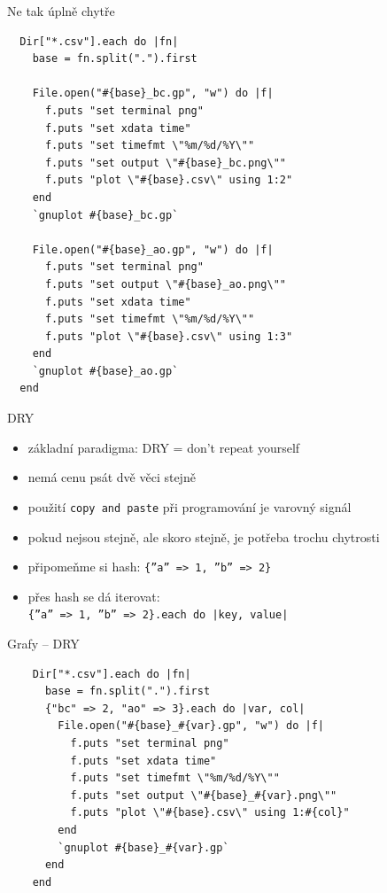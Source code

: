 \documentclass{beamer}
\begin{document}
\begin{frame}[fragile]{Ne tak úplně chytře}
  \tiny
\begin{verbatim}
  Dir["*.csv"].each do |fn|
    base = fn.split(".").first

    File.open("#{base}_bc.gp", "w") do |f|
      f.puts "set terminal png"
      f.puts "set xdata time"
      f.puts "set timefmt \"%m/%d/%Y\""
      f.puts "set output \"#{base}_bc.png\""
      f.puts "plot \"#{base}.csv\" using 1:2"
    end
    `gnuplot #{base}_bc.gp`

    File.open("#{base}_ao.gp", "w") do |f|
      f.puts "set terminal png"
      f.puts "set output \"#{base}_ao.png\""
      f.puts "set xdata time"
      f.puts "set timefmt \"%m/%d/%Y\""
      f.puts "plot \"#{base}.csv\" using 1:3"
    end
    `gnuplot #{base}_ao.gp`
  end
\end{verbatim}
\end{frame}

\begin{frame}[fragile]{DRY}
  \begin{itemize}
    \item základní paradigma: DRY = don't repeat yourself
    \item nemá cenu psát dvě věci stejně
    \item použití \texttt{copy and paste} při programování je varovný signál
    \item pokud nejsou stejně, ale skoro stejně, je potřeba trochu chytrosti
    \item připomeňme si hash: \texttt{\{''a'' => 1, ''b'' => 2\}}
    \item přes hash se dá iterovat: \\ \texttt{\{''a'' => 1, ''b'' => 2\}.each do |key, value|}
  \end{itemize}
\end{frame}

\begin{frame}[fragile]{Grafy -- DRY}
  \tiny
  \begin{verbatim}
    Dir["*.csv"].each do |fn|
      base = fn.split(".").first
      {"bc" => 2, "ao" => 3}.each do |var, col|
        File.open("#{base}_#{var}.gp", "w") do |f|
          f.puts "set terminal png"
          f.puts "set xdata time"
          f.puts "set timefmt \"%m/%d/%Y\""
          f.puts "set output \"#{base}_#{var}.png\""
          f.puts "plot \"#{base}.csv\" using 1:#{col}"
        end
        `gnuplot #{base}_#{var}.gp`
      end
    end
  \end{verbatim}
\end{frame}
\end{document}
